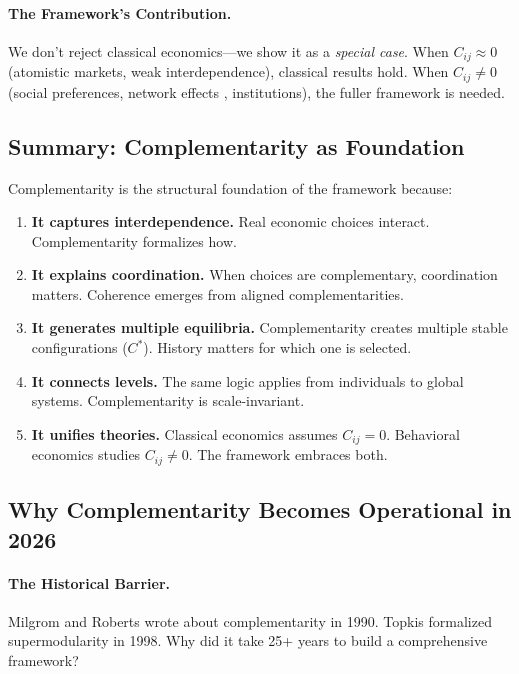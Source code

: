 \documentclass[12pt,a4paper]{article}
\begin{document}
\paragraph{The Framework's Contribution.}
We don't reject classical economics---we show it as a \emph{special case}.
When $C_{ij} \approx 0$ (atomistic markets, weak interdependence), classical results hold.
When $C_{ij} \neq 0$ (social preferences, network effects \citep{granovetter1985}, institutions), the fuller framework is needed.

\subsection{Summary: Complementarity as Foundation}

Complementarity is the structural foundation of the framework because:

\begin{enumerate}
  \item \textbf{It captures interdependence.}
        Real economic choices interact. Complementarity formalizes how.

  \item \textbf{It explains coordination.}
        When choices are complementary, coordination matters.
        Coherence emerges from aligned complementarities.

  \item \textbf{It generates multiple equilibria.}
        Complementarity creates multiple stable configurations ($C^*$).
        History matters for which one is selected.

  \item \textbf{It connects levels.}
        The same logic applies from individuals to global systems.
        Complementarity is scale-invariant.

  \item \textbf{It unifies theories.}
        Classical economics assumes $C_{ij} = 0$.
        Behavioral economics studies $C_{ij} \neq 0$.
        The framework embraces both.
\end{enumerate}

\subsection{Why Complementarity Becomes Operational in 2026}

\paragraph{The Historical Barrier.}
Milgrom and Roberts wrote about complementarity in 1990.
Topkis formalized supermodularity in 1998.
Why did it take 25+ years to build a comprehensive framework?
\end{document}
